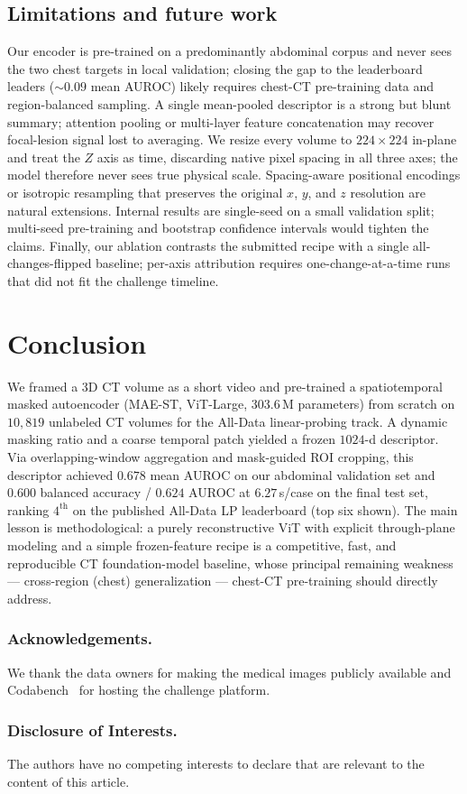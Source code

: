 \documentclass[runningheads]{llncs}
\begin{document}
\subsection{Limitations and future work}
\label{sec:limitations}
Our encoder is pre-trained on a predominantly
abdominal corpus and never sees the two chest targets in local validation;
closing the gap to the leaderboard leaders ($\sim\!0.09$ mean AUROC) likely
requires chest-CT pre-training data and region-balanced sampling. A single
mean-pooled descriptor is a strong but blunt
summary; attention pooling or multi-layer feature concatenation may recover
focal-lesion signal lost to averaging. We resize every volume to $224\times224$
in-plane and treat the $Z$ axis as time, discarding native pixel spacing in all
three axes; the model therefore never sees true physical scale. Spacing-aware
positional encodings or isotropic resampling that preserves the original $x$,
$y$, and $z$ resolution are natural extensions. Internal results are single-seed
on a small validation split;
multi-seed pre-training and bootstrap confidence intervals would tighten the
claims. Finally, our ablation contrasts the submitted recipe with
a single all-changes-flipped baseline; per-axis attribution requires
one-change-at-a-time runs that did not fit the challenge timeline.

\section{Conclusion}
We framed a 3D CT volume as a short video and pre-trained a spatiotemporal masked
autoencoder (MAE-ST, ViT-Large, $303.6$\,M parameters) from scratch on
$10{,}819$ unlabeled CT volumes for the All-Data linear-probing track. A dynamic
masking ratio and a coarse temporal patch yielded a frozen $1024$-d descriptor.
Via overlapping-window aggregation and mask-guided ROI cropping, this descriptor
achieved $0.678$ mean AUROC on our abdominal validation set and $0.600$ balanced
accuracy / $0.624$ AUROC at $6.27$\,s/case on the final test set, ranking
$4^{\text{th}}$ on the published All-Data LP leaderboard (top six shown). The main
lesson is methodological: a purely reconstructive ViT with explicit
through-plane modeling and a simple frozen-feature recipe is a competitive,
fast, and reproducible CT foundation-model baseline, whose principal remaining
weakness --- cross-region (chest) generalization --- chest-CT pre-training
should directly address.

\subsubsection{Acknowledgements.}
We thank the data owners for making the medical images publicly available and
Codabench~\cite{codabench} for hosting the challenge platform.

\subsubsection{Disclosure of Interests.}
The authors have no competing interests to declare that are relevant to the
content of this article.



\end{document}
